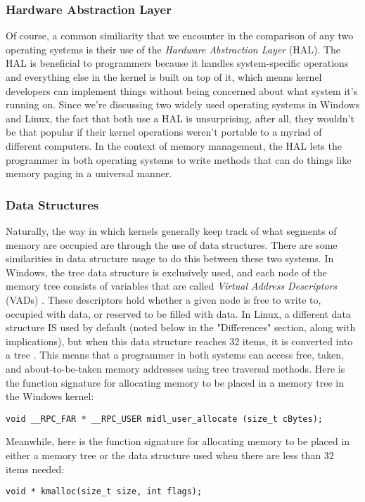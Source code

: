 \documentclass[letterpaper,10pt,draftclsnofoot,onecolumn,titlepage]{IEEEtran}
\begin{document}
\subsubsection{Hardware Abstraction Layer}
Of course, a common similiarity that we encounter in the comparison of any two operating systems is their use of the \emph{Hardware Abstraction Layer} (HAL). The HAL is beneficial to programmers because it handles system-specific operations and everything else in the kernel is built on top of it, which means kernel developers can implement things without being concerned about what system it's running on. Since we're discussing two widely used operating systems in Windows and Linux, the fact that both use a HAL is unsurprising, after all, they wouldn't be that popular if their kernel operations weren't portable to a myriad of different computers. In the context of memory management, the HAL lets the programmer in both operating systems to write methods that can do things like memory paging in a universal manner. 
\subsubsection{Data Structures}
Naturally, the way in which kernels generally keep track of what segments of memory are occupied are through the use of data structures. There are some similarities in data structure usage to do this between these two systems. In Windows, the tree data structure is exclusively used, and each node of the memory tree consists of variables that are called \emph{Virtual Address Descriptors} (VADs) \cite{windows3}. These descriptors hold whether a given node is free to write to, occupied with data, or reserved to be filled with data. In Linux, a different data structure IS used by default (noted below in the "Differences" section, along with implications), but when this data structure reaches 32 items, it is converted into a tree \cite{linux2}. This means that a programmer in both systems can access free, taken, and about-to-be-taken memory addresses using tree traversal methods.
Here is the function signature for allocating memory to be placed in a memory tree in the Windows kernel: \cite{windows3}
\begin{lstlisting}
void __RPC_FAR * __RPC_USER midl_user_allocate (size_t cBytes);
\end{lstlisting}

Meanwhile, here is the function signature for allocating memory to be placed in either a memory tree or the data structure used when there are less than 32 items needed:
\begin{lstlisting}
void * kmalloc(size_t size, int flags);
\end{lstlisting}
\end{document}
